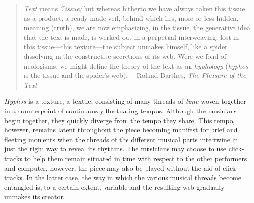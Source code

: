 \documentclass[11pt,letterpaper]{article}
\newcommand{\h}{{\it Hyphos}}
\begin{document}
\begin{quote}{{\it Text} means {\it Tissue;} but whereas hitherto we have always taken this tissue
as a product, a ready-made veil, behind which lies, more or less hidden, meaning (truth),
we are now emphasizing, in the tissue, the generative idea that the text is made, is 
worked out in a perpetual interweaving; lost in this tissue---this texture---the
subject unmakes himself, like a spider dissolving in the constructive secretions of its web.
Were we fond of neologisms, we might define the theory of the text as an {\it hyphology} 
({\it hyphos} is the tissue and the spider's web).} ---Roland Barthes, {\it The Pleasure of the Text}
\end{quote}

\h{} is a texture, a textile, consisting of many threads of {\it time} woven together
in a counterpoint of continuously fluctuating tempos. Although the musicians begin together, 
they quickly diverge from the tempo they share. This tempo, however, remains latent
throughout the piece becoming manifest for brief and fleeting moments when the threads
of the different musical parts
intertwine in just the right way to reveal its rhythms. 
The musicians may choose to use click-tracks to help them remain situated in time with respect to the 
other performers and computer, however, the piece may also be played without the aid
of click-tracks. In the latter case, the way in which the various musical threads
become entangled is, to a certain extent, variable and the resulting web gradually unmakes its creator.




\end{document}

